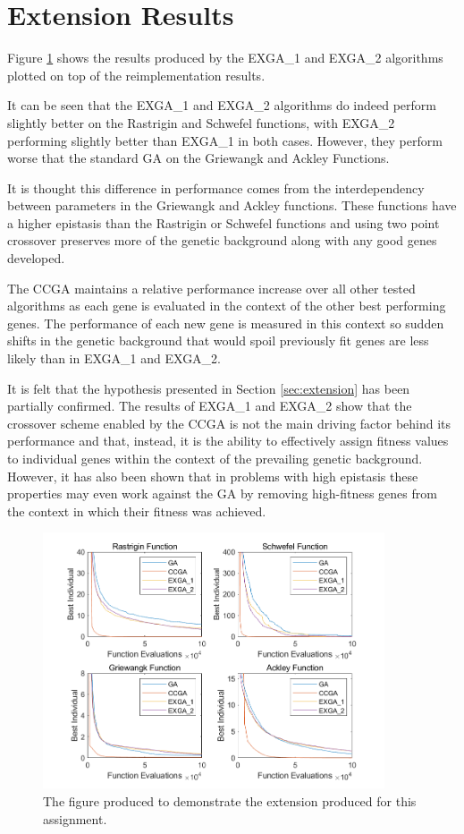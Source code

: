 \section{Extension Results} \label{sec:extension-results}

Figure \ref{fig:extension_plot} shows the results produced by the EXGA\_1 and EXGA\_2 algorithms plotted on top of the reimplementation results. 

It can be seen that the EXGA\_1 and EXGA\_2 algorithms do indeed perform slightly better on the Rastrigin and Schwefel functions, with EXGA\_2 performing slightly better than EXGA\_1 in both cases.
However, they perform worse that the standard GA on the Griewangk and Ackley Functions.

It is thought this difference in performance comes from the interdependency between parameters in the Griewangk and Ackley functions. 
These functions have a higher epistasis than the Rastrigin or Schwefel functions and using two point crossover preserves more of the genetic background along with any good genes developed.

The CCGA maintains a relative performance increase over all other tested algorithms as each gene is evaluated in the context of the other best performing genes. 
The performance of each new gene is measured in this context so sudden shifts in the genetic background that would spoil previously fit genes are less likely than in EXGA\_1 and EXGA\_2.

It is felt that the hypothesis presented in Section \ref{sec:extension} has been partially confirmed.
The results of EXGA\_1 and EXGA\_2 show that the crossover scheme enabled by the CCGA is not the main driving factor behind its performance and that, instead, it is the ability to effectively assign fitness values to individual genes within the context of the prevailing genetic background.
However, it has also been shown that in problems with high epistasis these properties may even work against the GA by removing high-fitness genes from the context in which their fitness was achieved. 

\begin{figure}[ht!]
    \centering 
    \includegraphics[width=0.9\textwidth]{img/extension_plot.png}
    \caption{The figure produced to demonstrate the extension produced for this assignment.}
    \label{fig:extension_plot}
  \end{figure}
